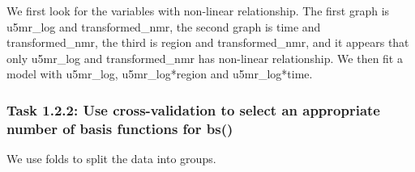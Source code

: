 \documentclass[
]{article}
\begin{document}
We first look for the variables with non-linear relationship. The first
graph is u5mr\_log and transformed\_nmr, the second graph is time and
transformed\_nmr, the third is region and transformed\_nmr, and it
appears that only u5mr\_log and transformed\_nmr has non-linear
relationship. We then fit a model with u5mr\_log, u5mr\_log*region and
u5mr\_log*time.

\hypertarget{task-1.2.2-use-cross-validation-to-select-an-appropriate-number-of-basis-functions-for-bs}{%
\subsubsection{Task 1.2.2: Use cross-validation to select an appropriate
number of basis functions for
bs()}\label{task-1.2.2-use-cross-validation-to-select-an-appropriate-number-of-basis-functions-for-bs}}

We use folds to split the data into groups.
\end{document}
